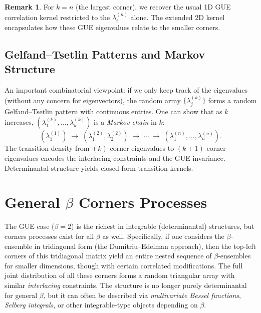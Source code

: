 \documentclass[letterpaper,11pt,oneside,reqno]{article}
\numberwithin{equation}{section}
\theoremstyle{definition}
\newtheorem{remark}[proposition]{Remark}
\begin{document}
\begin{remark}
For $k=n$ (the largest corner), we recover the usual 1D GUE correlation kernel restricted to the $\lambda_i^{(n)}$ alone. The extended 2D kernel encapsulates how these GUE eigenvalues relate to the smaller corners.
\end{remark}

\subsection{Gelfand--Tsetlin Patterns and Markov Structure}
An important combinatorial viewpoint: if we only keep track of the eigenvalues (without any concern for eigenvectors), the random array $\{\lambda_j^{(k)}\}$ forms a random Gelfand--Tsetlin pattern with continuous entries. One can show that as $k$ increases, $(\lambda_1^{(k)},\dots,\lambda_k^{(k)})$ is a \emph{Markov chain} in $k$:
\[
	(\lambda_1^{(1)})
	\;\longrightarrow\;
	(\lambda_1^{(2)},\lambda_2^{(2)})
	\;\longrightarrow\;
	\cdots
	\;\longrightarrow\;
	(\lambda_1^{(n)},\dots,\lambda_n^{(n)}).
\]
The transition density from $(k)$-corner eigenvalues to $(k+1)$-corner eigenvalues encodes the interlacing constraints and the GUE invariance. Determinantal structure yields closed-form transition kernels.

\section{General $\beta$ Corners Processes}
\label{sec:generalbeta}

The GUE case ($\beta=2$) is the richest in integrable (determinantal) structures, but corners processes exist for all $\beta$ as well. Specifically, if one considers the $\beta$-ensemble in tridiagonal form (the Dumitriu--Edelman approach), then the top-left corners of this tridiagonal matrix yield an entire nested sequence of $\beta$-ensembles for smaller dimensions, though with certain correlated modifications. The full joint distribution of all these corners forms a random triangular array with similar \emph{interlacing} constraints. The structure is no longer purely determinantal for general $\beta$, but it can often be described via \emph{multivariate Bessel functions}, \emph{Selberg integrals}, or other integrable-type objects depending on $\beta$.
\end{document}
